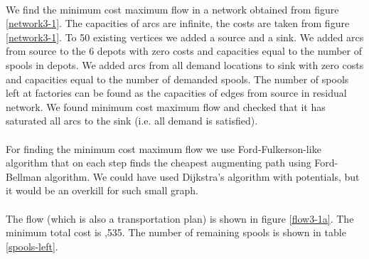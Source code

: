 \paragraph{}
We find the minimum cost maximum flow in a network obtained from figure \ref{network3-1}. The capacities of arcs are infinite, the costs are taken from figure \ref{network3-1}. To 50 existing vertices we added a source and a sink. We added arcs from source to the 6 depots with zero costs and capacities equal to the number of spools in depots. We added arcs from all demand locations to sink with zero costs and capacities equal to the number of demanded spools. The number of spools left at factories can be found as the capacities of edges from source in residual network. We found minimum cost maximum flow and checked that it has saturated all arcs to the sink (i.e. all demand is satisfied).

\paragraph{}
For finding the minimum cost maximum flow we use Ford-Fulkerson-like algorithm that on each step finds the cheapest augmenting path using Ford-Bellman algorithm. We could have used Dijkstra's algorithm with potentials, but it would be an overkill for such small graph.

\paragraph{}
The flow (which is also a transportation plan) is shown in figure \ref{flow3-1a}. The minimum total cost is ,535. The number of remaining spools is shown in table \ref{spools-left}.


